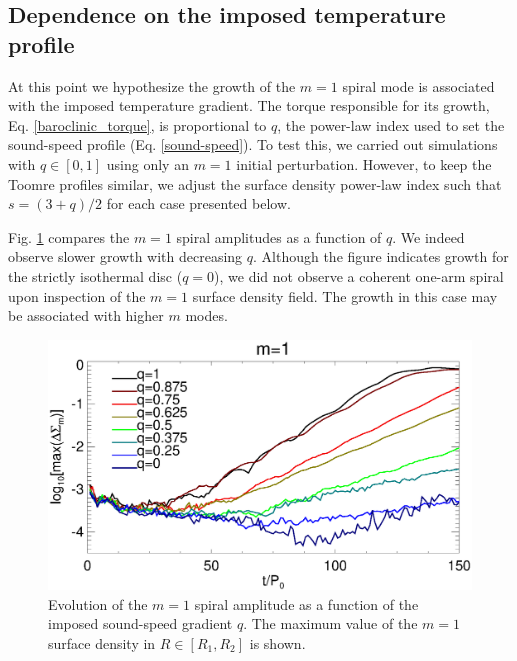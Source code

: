 
\subsection{Dependence on the imposed temperature profile} 
At this point we hypothesize the growth of the $m=1$ spiral mode is
associated with the imposed temperature gradient. The torque
responsible for its growth, Eq. \ref{baroclinic_torque}, is
proportional to $q$, the power-law index used to set the sound-speed
profile (Eq. \ref{sound-speed}). To test this, we carried out
simulations with $q\in[0,1]$ using only an $m=1$ initial 
perturbation. However, to keep the Toomre profiles similar, we adjust
the surface density power-law index such that $s = (3+q)/2$ for each
case presented below. %

Fig. \ref{fargo_varq} compares the $m=1$ spiral amplitudes as a
function of $q$. We indeed observe slower growth with decreasing
$q$. Although the figure indicates growth for the strictly isothermal
disc ($q=0$), we did not observe a coherent one-arm spiral upon
inspection of the $m=1$ surface density field. The growth in this case
may be associated with higher $m$ modes. %

\begin{figure}
  \includegraphics[width=\linewidth]{figures/m1_analysis_plot_fargo_varq.ps}   
  \caption{Evolution of the $m=1$ spiral amplitude as a function of
    the imposed sound-speed gradient $q$. The maximum value of the
    $m=1$ surface density in $R\in[R_1,R_2]$ is shown. 
    \label{fargo_varq}} 
\end{figure}

